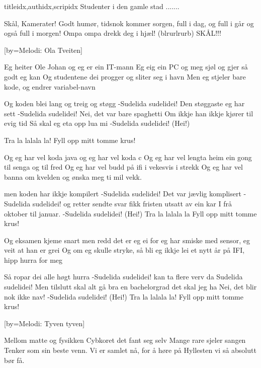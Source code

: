 \documentclass[14pt,letterpaper,norsk]{article}
\begin{document}
\begin{songs}{titleidx,authidx,scripidx}
\beginchorus
Studenter i den gamle stad .......
\endchorus

\endsong


\beginverse
Skål, Kamerater!  
Godt humør,   
tidsnok kommer sorgen,  
full i dag, og full i går  
og også full i morgen!  
Ompa ompa drekk deg i hjæl!  
(blrurlrurb) SKÅL!!!  
\endverse

\endsong

[by=Melodi: Ola Tveiten]

\beginverse
Eg heiter Ole Johan og eg er ein IT-mann
Eg eig ein PC og meg sjøl og gjer så godt eg kan
Og studentene dei progger og sliter seg i havn
Men eg stjeler bare kode, og endrer variabel-navn
\endverse

\beginchorus
Og koden blei lang og treig og støgg
-Sudelida sudelidei!
Den støggaste eg har sett
-Sudelida sudelidei!
Nei, det var bare spaghetti
Om ikkje han ikkje kjører til evig tid
Så skal eg eta opp lua mi
-Sudelida sudelidei! (Hei!)
\endchorus

\beginchorus
Tra la lalala la!
Fyll opp mitt tomme krus!
\endchorus

\beginverse
Og eg har vel koda java og eg har vel koda c
Og eg har vel lengta heim ein gong til senga og til fred
Og eg har vel budd på ifi i vekesvis i strekk
Og eg har vel banna om kvelden og ønska meg ti mil vekk.
\endverse

\beginchorus
men koden har ikkje kompilert
-Sudelida sudelidei!
Det var jævlig komplisert
-Sudelida sudelidei!
og retter sendte svar
fikk fristen utsatt av ein kar
I frå oktober til januar.
-Sudelida sudelidei! (Hei!)
Tra la lalala la
Fyll opp mitt tomme krus!
\endchorus

\beginverse
Og eksamen kjeme snart men redd det er eg ei
for eg har smiske med sensor, eg veit at han er grei
Og om eg skulle stryke, så bli eg ikkje lei
et nytt år på IFI, hipp hurra for meg
\endverse

\beginchorus
Så ropar dei alle høgt hurra
-Sudelida sudelidei!
kan ta flere verv da
Sudelida sudelidei!
Men tilslutt skal alt gå bra
en bachelorgrad det skal jeg ha
Nei, det blir nok ikke nav!
-Sudelida sudelidei! (Hei!)
Tra la lalala la!
Fyll opp mitt tomme krus!
\endchorus

[by=Melodi: Tyven tyven]

\beginverse
Mellom matte og fysikken
Cybkoret det fant seg selv
Mange rare sjeler sangen
Tenker som sin beste venn.
Vi er samlet nå, for å høre på
Hyllesten vi så absolutt bør få.
\endverse


\end{songs}
\end{document}
